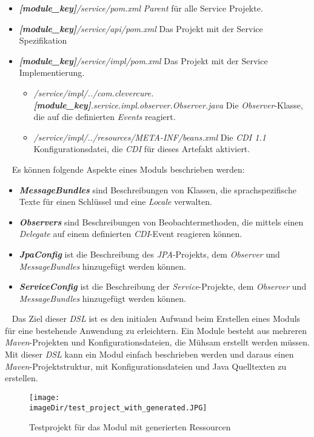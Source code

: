 \begin{itemize}
	\item\emph{\textbf{[module\_key]}/service/pom.xml}
	\newline
	\emph{Parent} für alle Service Projekte.
	
	\item\emph{\textbf{[module\_key]}/service/api/pom.xml}
	\newline
	Das Projekt mit der Service Spezifikation

	\item\emph{\textbf{[module\_key]}/service/impl/pom.xml}
	\newline
	Das Projekt mit der Service Implementierung.
	\begin{itemize}
		\item\emph{/service/impl/../com.clevercure.\textbf{[module\_key]}.service.impl.observer.Observer.java}
		\newline
		Die \emph{Observer}-Klasse, die auf die definierten \emph{Events} reagiert.
		\item\emph{/service/impl/../resources/META-INF/beans.xml}
		\newline
		Die \emph{CDI 1.1} Konfigurationsdatei, die \emph{CDI} für dieses Artefakt aktiviert.	
	\end{itemize}
\end{itemize}
\ \newline
Es können folgende Aspekte eines Moduls beschrieben werden:
\begin{itemize}
	\item\textbf{\emph{MessageBundles}} sind Beschreibungen von Klassen, die sprachspezifische Texte für einen Schlüssel und eine \emph{Locale} verwalten.
	
	\item\textbf{\emph{Observers}} sind Beschreibungen von Beobachtermethoden, die mittels einen \emph{Delegate} auf einem definierten \emph{CDI}-Event reagieren können.
	
	\item\textbf{\emph{JpaConfig}} ist die Beschreibung des \emph{JPA}-Projekts, dem \emph{Observer} und \emph{MessageBundles} hinzugefügt werden können.
	
	\item\textbf{\emph{ServiceConfig}} ist die Beschreibung der \emph{Service}-Projekte, dem \emph{Observer} und \emph{MessageBundles} hinzugefügt werden können.
\end{itemize}
\ \newline
Das Ziel dieser \emph{DSL} ist es den initialen Aufwand beim Erstellen eines Moduls für eine bestehende Anwendung zu erleichtern. Ein Module besteht aus mehreren \emph{Maven}-Projekten und Konfigurationsdateien, die Mühsam erstellt werden müssen. Mit dieser \emph{DSL} kann ein Modul einfach beschrieben werden und daraus einen \emph{Maven}-Projektstruktur, mit Konfigurationsdateien und Java Quelltexten zu erstellen.
\begin{figure}[h]
	\centering
	\texttt{[image: \\imageDir/test\_project\_with\_generated.JPG]}
	\caption{Testprojekt für das Modul mit generierten Ressourcen}
	\label{fig:3-test}
\end{figure}
\ \newpage

